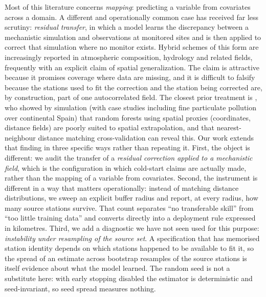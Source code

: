 \documentclass[review,times,authoryear]{elsarticle}
\begin{document}
Most of this literature concerns \emph{mapping}: predicting a variable from covariates
across a domain. A different and operationally common case has received far less
scrutiny: \emph{residual transfer}, in which a model learns the discrepancy between a
mechanistic simulation and observations at monitored sites and is then applied to correct
that simulation where no monitor exists. Hybrid schemes of this form are increasingly
reported in atmospheric composition, hydrology and related fields, frequently with an
explicit claim of spatial generalization. The claim is attractive because it promises coverage where data are missing, and it is difficult to falsify because the
stations used to fit the correction and the station being corrected are, by construction,
part of one autocorrelated field. The closest prior treatment is \citet{mila2024proxies},
who showed by simulation (with case studies including fine particulate pollution over
continental Spain) that random forests using spatial proxies (coordinates, distance
fields) are poorly suited to spatial extrapolation, and that nearest-neighbour distance
matching cross-validation can reveal this. Our work extends that finding in three
specific ways rather than repeating it. First, the object is different: we audit the
transfer of a \emph{residual correction applied to a mechanistic field}, which is the
configuration in which cold-start claims are actually made, rather than the mapping of a
variable from covariates. Second, the instrument is different in a way that matters
operationally: instead of matching distance distributions, we sweep an explicit buffer
radius and report, at every radius, how many source stations survive. That count
separates ``no transferable skill'' from ``too little training data'' and converts
directly into a deployment rule expressed in kilometres. Third, we add a diagnostic we have not seen used
for this purpose: \emph{instability under resampling of the source set}. A specification
that has memorised station identity depends on which stations happened to be available to
fit it, so the spread of an estimate across bootstrap resamples of the source stations is
itself evidence about what the model learned. The random seed is not a substitute here:
with early stopping disabled the estimator is deterministic and seed-invariant, so seed
spread measures nothing.
\end{document}
